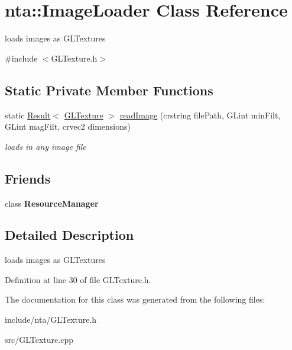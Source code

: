 \hypertarget{classnta_1_1ImageLoader}{}\section{nta\+:\+:Image\+Loader Class Reference}
\label{classnta_1_1ImageLoader}


loads images as G\+L\+Textures  




{\ttfamily \#include $<$G\+L\+Texture.\+h$>$}

\subsection*{Static Private Member Functions}
\begin{DoxyCompactItemize}
\item 
\mbox{\label{classnta_1_1ImageLoader_ae4902a82fc36dd4ec8d78a1aa610d0cc}} 
static \hyperlink{classnta_1_1Result}{Result}$<$ \hyperlink{structnta_1_1GLTexture}{G\+L\+Texture} $>$ \hyperlink{classnta_1_1ImageLoader_ae4902a82fc36dd4ec8d78a1aa610d0cc}{read\+Image} (crstring file\+Path, G\+Lint min\+Filt, G\+Lint mag\+Filt, crvec2 dimensions)
\begin{DoxyCompactList}\small\item\em loads in any image file \end{DoxyCompactList}\end{DoxyCompactItemize}
\subsection*{Friends}
\begin{DoxyCompactItemize}
\item 
\mbox{\label{classnta_1_1ImageLoader_a54c1252abc87a78a301e6b6984470408}} 
class {\bfseries Resource\+Manager}
\end{DoxyCompactItemize}


\subsection{Detailed Description}
loads images as G\+L\+Textures 

Definition at line 30 of file G\+L\+Texture.\+h.



The documentation for this class was generated from the following files\+:\begin{DoxyCompactItemize}
\item 
include/nta/G\+L\+Texture.\+h\item 
src/G\+L\+Texture.\+cpp\end{DoxyCompactItemize}
